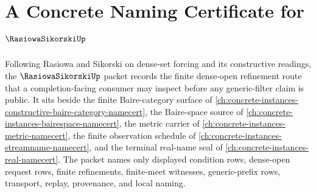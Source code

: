 \chapter{A Concrete Naming Certificate for $\RasiowaSikorskiUp$}
\label{ch:concrete-instances-rasiowa-sikorski-namecert}

Following Rasiowa and Sikorski on dense-set forcing and its constructive readings, the $\RasiowaSikorskiUp$ packet records the finite dense-open refinement route that a completion-facing consumer may inspect before any generic-filter claim is public. It sits beside the finite Baire-category surface of \autoref{ch:concrete-instances-constructive-baire-category-namecert}, the Baire-space source of \autoref{ch:concrete-instances-bairespace-namecert}, the metric carrier of \autoref{ch:concrete-instances-metric-namecert}, the finite observation schedule of \autoref{ch:concrete-instances-streamname-namecert}, and the terminal real-name seal of \autoref{ch:concrete-instances-real-namecert}. The packet names only displayed condition rows, dense-open request rows, finite refinements, finite-meet witnesses, generic-prefix rows, transport, replay, provenance, and local naming.

